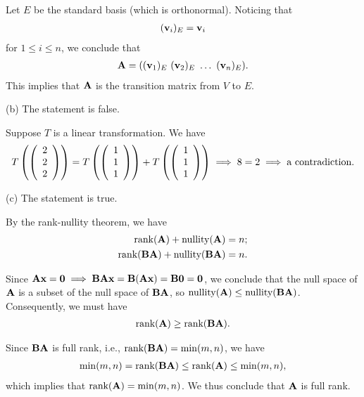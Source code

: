 \documentclass[12pt]{amsart}
\theoremstyle{plain}
\theoremstyle{definition}
\def\bf{\textbf}
\newcommand{\tu}{\textup}
\newcommand{\RA}{\implies}
\newcommand{\rank}{\textup{rank}}
\newcommand{\nullity}{\textup{nullity}}
\begin{document}
Let $E$ be the standard basis (which is orthonormal). Noticing that 
\begin{align*}
	(\bf v_i)_E=\bf v_i
\end{align*}
for $1\leq i\leq n$, we conclude that 
\begin{align*}
	\bf A=((\bf v_1)_E\ (\bf v_2)_E\ \ldots\ (\bf v_n)_E).
\end{align*}
This implies that $\bf A$ is the transition matrix from $V$ to $E$.

(b) The statement is false.

Suppose $T$ is a linear transformation. We have
\begin{align*}
	T\left(\left(
	\begin{array}{c}
		2\\
		2\\
		2\\
	\end{array}
	\right)\right)=
	T\left(\left(
	\begin{array}{c}
		1\\
		1\\
		1\\
	\end{array}
	\right)\right)+
	T\left(\left(
	\begin{array}{c}
		1\\
		1\\
		1\\
	\end{array}
	\right)\right)\RA 8=2\RA \tu{a contradiction.}
\end{align*}

(c) The statement is true.

By the rank-nullity theorem, we have
\begin{align*}
	\rank(\bf A)+\nullity(\bf A)=n;\\
	\rank(\bf B\bf A)+\nullity(\bf B\bf A)=n.
\end{align*}

Since $\bf A\bf x=\bf 0\RA\bf B\bf A\bf x=\bf B(\bf A\bf x)=\bf B\bf0=\bf 0$, we conclude that the null space of $\bf A$ is a subset of the null space of $\bf B\bf A$, so $\nullity(\bf A)\leq \nullity(\bf B\bf A)$. Consequently, we must have
\begin{align*}
	\rank(\bf A)\geq \rank(\bf B\bf A).
\end{align*}

Since $\bf B\bf A$ is full rank, i.e., $\rank(\bf B\bf A)=\min(m,n)$, we have
\begin{align*}
	\min(m,n)=\rank(\bf B\bf A)\leq \rank(\bf A)\leq \min(m,n),
\end{align*}
which implies that $\rank(\bf A)=\min(m,n)$. We thus conclude that $\bf A$ is full rank.
\end{document}
